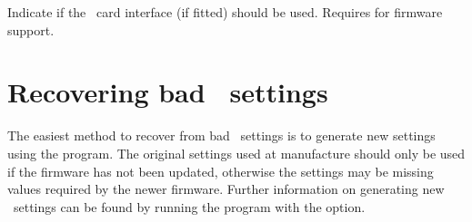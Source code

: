Indicate if the \sd\ card interface (if fitted) should be used. Requires
 for firmware support.



\section[Recovering bad EEPROM settings]{%
  Recovering bad \eeprom\ settings}
\label{sec:bad-eeprom-settings}

The easiest method to recover from bad \eeprom\ settings is to generate new
settings using the  program. The original
settings used at manufacture should only be used if the firmware has not been
updated, otherwise the settings may be missing values required by the newer
firmware. Further information on generating new \eeprom\ settings can be found
by running the  program with the 
option.

